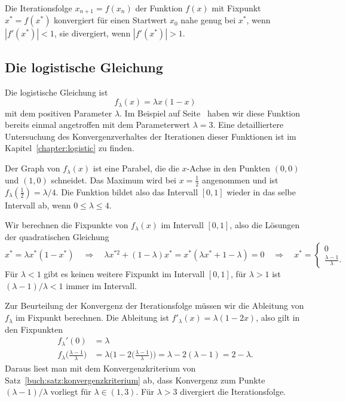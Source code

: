 \begin{satz}
\label{buch:satz:konvergenzkriterium}
%
%
Die Iterationsfolge $x_{n+1}=f(x_n)$ der Funktion $f(x)$ mit Fixpunkt
$x^*=f(x^*)$ konvergiert für einen Startwert $x_0$ nahe genug bei $x^*$,
wenn $|f'(x^*)|<1$, sie divergiert, wenn $|f'(x^*)|>1$.
\end{satz}

%
%
\subsection{Die logistische Gleichung
\label{buch:subsection:logistisch}}
Die logistische Gleichung ist 
%
\[
f_\lambda(x) = \lambda x(1-x)
\]
mit dem positiven Parameter $\lambda$.
Im Beispiel auf Seite~\pageref{buch:beispiel:logistisch3} haben wir
diese Funktion bereits einmal angetroffen mit dem Parameterwert
$\lambda=3$.
Eine detailliertere Untersuchung des Konvergenzverhaltes der Iterationen
dieser Funktionen ist im Kapitel~\ref{chapter:logistic} zu finden.

Der Graph von $f_\lambda(x)$ ist eine Parabel, die die $x$-Achse
in den Punkten $(0,0)$ und $(1,0)$ schneidet.
%
Das Maximum wird bei $x=\frac12$ angenommen und ist
$f_\lambda(\frac12)=\lambda/4$.
Die Funktion bildet also das Intervall $[0,1]$ wieder in das selbe Intervall
ab, wenn $0\le \lambda\le 4$.

Wir berechnen die Fixpunkte von $f_\lambda(x)$ im Intervall $[0,1]$, also
die Lösungen der quadratischen Gleichung
\[
x^*  = \lambda x^* (1-x^*)
\quad\Rightarrow\quad
\lambda x^{*2} +(1-\lambda)x^*
=
x^* (\lambda x^* + 1-\lambda) 
=0
\quad\Rightarrow\quad
x^*
=
\begin{cases}
0&\\
\displaystyle \frac{\lambda-1}{\lambda}.&
\end{cases}
\]
Für $\lambda<1$ gibt es keinen weitere Fixpunkt im Intervall $[0,1]$, für
$\lambda>1$ ist $(\lambda-1)/\lambda<1$ immer im Intervall.

Zur Beurteilung der Konvergenz der Iterationsfolge müssen wir die Ableitung
von $f_\lambda$ im Fixpunkt berechnen.
Die Ableitung ist $f'_\lambda(x)=\lambda (1-2x)$, also gilt in den Fixpunkten
\begin{align*}
f_\lambda'(0)
&=
\lambda
\\
f_\lambda\biggl(\frac{\lambda-1}{\lambda}\biggr)
&=
\lambda\biggl( 1-2
\biggl(\frac{\lambda-1}{\lambda}\biggr)\biggr)
=
\lambda-2(\lambda-1)
=
2-\lambda.
\end{align*}
Daraus liest man mit dem Konvergenzkriterium von
Satz~\ref{buch:satz:konvergenzkriterium} ab, dass Konvergenz zum Punkte
$(\lambda-1)/\lambda$ vorliegt für $\lambda \in (1,3)$.
%
Für $\lambda>3$ divergiert die Iterationsfolge.

